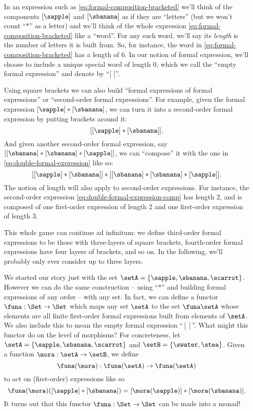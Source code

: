 In an expression such as \cref{eq:formal-composition-bracketed} we'll think of the components $[\sapple]$ and $[\sbanana]$ as if they are ``letters'' (but we won't count ``$*$'' as a letter) and we'll think of the whole expression \cref{eq:formal-composition-bracketed} like a ``word''. For any such word, we'll say its \emph{length} is the number of letters it is built from. So, for instance, the word in \cref{eq:formal-composition-bracketed} has a length of $6$. In our notion of formal expression, we'll choose to include a unique special word of length $0$, which we call the ``empty formal expression'' and denote by ``[ ]''.  


 
Using square brackets we can also build ``formal expressions of formal expressions'' or ``second-order formal expressions''. For example, given the formal expression $[\sapple] * [\sbanana]$, we can turn it into a second-order formal expression by putting brackets around it: 
\begin{equation}\label{eq:double-formal-expression}
[[\sapple] * [\sbanana]].
\end{equation}
And given another second-order formal expression, say $[[\sbanana] * [\sbanana] * [\sapple]]$, we can ``compose'' it with the one in \cref{eq:double-formal-expression} like so: 
\begin{equation}\label{eq:double-formal-expression-comp}
[[\sapple] * [\sbanana]] * [[\sbanana] * [\sbanana] * [\sapple]]. 
\end{equation}
The notion of length will also apply to second-order expressions. For instance, the second-order expression \cref{eq:double-formal-expression-comp} has length 2, and is composed of one first-order expression of length 2 and one first-order expression of length 3. 

This whole game can continue ad infinitum: we define third-order formal expressions to be those with three-layers of square brackets, fourth-order formal expressions have four layers of brackets, and so on. In the following, we'll probably only ever consider up to three layers. 

We started our story just with the set $\setA = \{ \sapple, \sbanana, \scarrot \}$. However we can do the same construction -- using ``$*$'' and building formal expressions of any order -- with any set. In fact, we can define a functor $\funa: \Set \to \Set$ which maps any set $\setA$ to the set $\funa \setA$ whose elements are all finite first-order formal expressions built from elements of $\setA$. We also include this to mean the empty formal expression ``$[ ]$''. What might this functor do on the level of morphisms? For concreteness, let $\setA = \{ \sapple, \sbanana, \scarrot \} $ and $\setB = \{ \swater, \stea \}$. Given a function $\mora: \setA \to \setB$, we define
\begin{equation}
\funa(\mora) : \funa(\setA) \to \funa(\setA)
\end{equation}
to act on (first-order) expressions like so
\begin{equation}
\funa(\mora)([\sapple]*[\sbanana]) = [\mora(\sapple)]*[\mora(\sbanana)].
\end{equation}
It turns out that this functor $\funa: \Set \to \Set$ can be made into a monad! 

